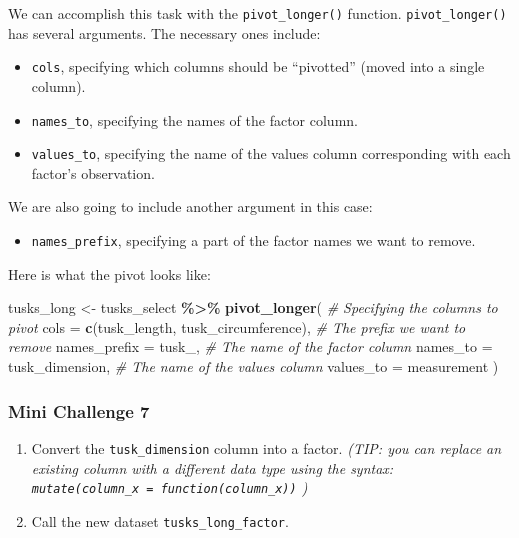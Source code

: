 \documentclass[
]{article}
\newenvironment{Shaded}{\begin{snugshade}}{\end{snugshade}}
\newcommand{\AttributeTok}[1]{\textcolor[rgb]{0.13,0.29,0.53}{#1}}
\newcommand{\CommentTok}[1]{\textcolor[rgb]{0.56,0.35,0.01}{\textit{#1}}}
\newcommand{\FunctionTok}[1]{\textcolor[rgb]{0.13,0.29,0.53}{\textbf{#1}}}
\newcommand{\NormalTok}[1]{#1}
\newcommand{\OtherTok}[1]{\textcolor[rgb]{0.56,0.35,0.01}{#1}}
\newcommand{\SpecialCharTok}[1]{\textcolor[rgb]{0.81,0.36,0.00}{\textbf{#1}}}
\newcommand{\StringTok}[1]{\textcolor[rgb]{0.31,0.60,0.02}{#1}}
\providecommand{\tightlist}{%
  \setlength{\itemsep}{0pt}\setlength{\parskip}{0pt}}
\begin{document}
We can accomplish this task with the \texttt{pivot\_longer()} function.
\texttt{pivot\_longer()} has several arguments. The necessary ones
include:

\begin{itemize}
\tightlist
\item
  \texttt{cols}, specifying which columns should be ``pivotted'' (moved
  into a single column).
\item
  \texttt{names\_to}, specifying the names of the factor column.
\item
  \texttt{values\_to}, specifying the name of the values column
  corresponding with each factor's observation.
\end{itemize}

We are also going to include another argument in this case:

\begin{itemize}
\tightlist
\item
  \texttt{names\_prefix}, specifying a part of the factor names we want
  to remove.
\end{itemize}

Here is what the pivot looks like:

\begin{Shaded}
\begin{Highlighting}[]
\NormalTok{tusks\_long }\OtherTok{\textless{}{-}}\NormalTok{ tusks\_select }\SpecialCharTok{\%\textgreater{}\%}
  \FunctionTok{pivot\_longer}\NormalTok{(}
    \CommentTok{\# Specifying the columns to pivot}
    \AttributeTok{cols =} \FunctionTok{c}\NormalTok{(tusk\_length, tusk\_circumference),}
    \CommentTok{\# The prefix we want to remove}
    \AttributeTok{names\_prefix =} \StringTok{\textquotesingle{}tusk\_\textquotesingle{}}\NormalTok{,}
    \CommentTok{\# The name of the factor column}
    \AttributeTok{names\_to =} \StringTok{\textquotesingle{}tusk\_dimension\textquotesingle{}}\NormalTok{,}
    \CommentTok{\# The name of the values column}
    \AttributeTok{values\_to =} \StringTok{\textquotesingle{}measurement\textquotesingle{}}
\NormalTok{  )}
\end{Highlighting}
\end{Shaded}

\subsubsection{\texorpdfstring{\textbf{Mini Challenge
7}}{Mini Challenge 7}}\label{mini-challenge-7}

\begin{enumerate}
\def\labelenumi{\arabic{enumi}.}
\tightlist
\item
  Convert the \texttt{tusk\_dimension} column into a factor. \emph{(TIP:
  you can replace an existing column with a different data type using
  the syntax: \texttt{mutate(column\_x\ =\ function(column\_x))} )}
\item
  Call the new dataset \texttt{tusks\_long\_factor}.
\end{enumerate}
\end{document}
